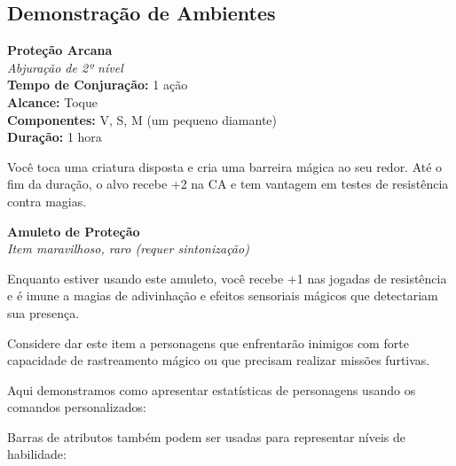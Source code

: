 \subsection{Demonstração de Ambientes}

\begin{spell}
\textbf{Proteção Arcana}\\
\textit{Abjuração de 2º nível}\\
\textbf{Tempo de Conjuração:} 1 ação\\
\textbf{Alcance:} Toque\\
\textbf{Componentes:} V, S, M (um pequeno diamante)\\
\textbf{Duração:} 1 hora

Você toca uma criatura disposta e cria uma barreira mágica ao seu redor. Até o fim da duração, o alvo recebe +2 na CA e tem vantagem em testes de resistência contra magias.
\end{spell}


\begin{magicitem}
\textbf{Amuleto de Proteção}\\
\textit{Item maravilhoso, raro (requer sintonização)}

Enquanto estiver usando este amuleto, você recebe +1 nas jogadas de resistência e é imune a magias de adivinhação e efeitos sensoriais mágicos que detectariam sua presença.
\end{magicitem}

\begin{dmnote}
Considere dar este item a personagens que enfrentarão inimigos com forte capacidade de rastreamento mágico ou que precisam realizar missões furtivas.
\end{dmnote}


Aqui demonstramos como apresentar estatísticas de personagens usando os comandos personalizados:

      

    

Barras de atributos também podem ser usadas para representar níveis de habilidade:



